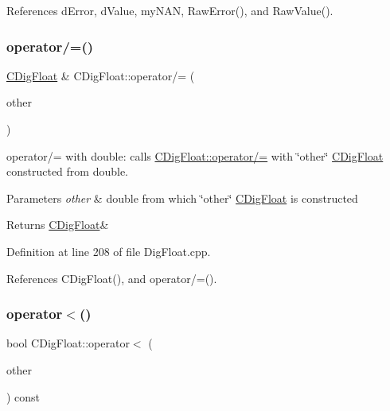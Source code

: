 References d\+Error, d\+Value, my\+N\+AN, Raw\+Error(), and Raw\+Value().

\mbox{\label{classCDigFloat_ab6531a2016f5cc631cc92719ffc06385}} 
\subsubsection{\texorpdfstring{operator/=()}{operator/=()}\hspace{0.1cm}{\footnotesize\ttfamily [2/2]}}
{\footnotesize\ttfamily \hyperlink{classCDigFloat}{C\+Dig\+Float} \& C\+Dig\+Float\+::operator/= (\begin{DoxyParamCaption}\item[{const double}]{other }\end{DoxyParamCaption})}



operator/= with double\+: calls \hyperlink{classCDigFloat_a53d3939dfc89d172f1bf803a46bc3369}{C\+Dig\+Float\+::operator/=} with \char`\"{}other\char`\"{} \hyperlink{classCDigFloat}{C\+Dig\+Float} constructed from double. 


\begin{DoxyParams}{Parameters}
{\em other} & double from which \char`\"{}other\char`\"{} \hyperlink{classCDigFloat}{C\+Dig\+Float} is constructed \\
\hline
\end{DoxyParams}
\begin{DoxyReturn}{Returns}
\hyperlink{classCDigFloat}{C\+Dig\+Float}\& 
\end{DoxyReturn}


Definition at line 208 of file Dig\+Float.\+cpp.



References C\+Dig\+Float(), and operator/=().

\mbox{\label{classCDigFloat_a159ef0b911dfba94ea468c36167c3a42}} 
\subsubsection{\texorpdfstring{operator$<$()}{operator<()}}
{\footnotesize\ttfamily bool C\+Dig\+Float\+::operator$<$ (\begin{DoxyParamCaption}\item[{const \hyperlink{classCDigFloat}{C\+Dig\+Float} \&}]{other }\end{DoxyParamCaption}) const}



